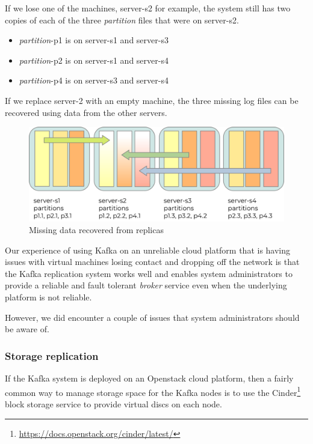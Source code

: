 \documentclass{article}
\newcommand{\openstack} {Openstack\xspace}
\newcommand{\kafka} {Kafka\xspace}
\newcommand{\kfbroker} {\textit{broker}\xspace}
\newcommand{\kfpartition} {\textit{partition}\xspace}
\newcommand{\footurl}[1] {\footnote{\url{#1}}}
\begin{document}
If we lose one of the machines, server-s2 for example, the system still has two copies of each of the three \kfpartition files that were on server-s2.

\begin{itemize}
    \item \kfpartition-p1 is on server-s1 and server-s3
    \item \kfpartition-p2 is on server-s1 and server-s4
    \item \kfpartition-p4 is on server-s3 and server-s4
\end{itemize}

If we replace server-2 with an empty machine, the three missing log files can be recovered using data from the other servers.

\begin{figure}[hbt!]
\centering
\includegraphics{images/kafka-partitions-04.png}
%
\caption{Missing data recovered from replicas}
\label{fig:kafka-partitions-04}
\end{figure}

Our experience of using \kafka on an unreliable cloud platform that is having issues with virtual machines losing contact and dropping off the network is that the \kafka replication system works well and enables system administrators to provide a reliable and fault tolerant \kfbroker service even when the underlying platform is not reliable.

However, we did encounter a couple of issues that system administrators should be aware of.

\subsubsection{Storage replication}
\label{storage-replication}

If the \kafka system is deployed on an \openstack cloud platform, then a fairly common way to manage storage space for the \kafka nodes is to use the Cinder\footurl{https://docs.openstack.org/cinder/latest/} block storage service to provide virtual discs on each node.
\end{document}
